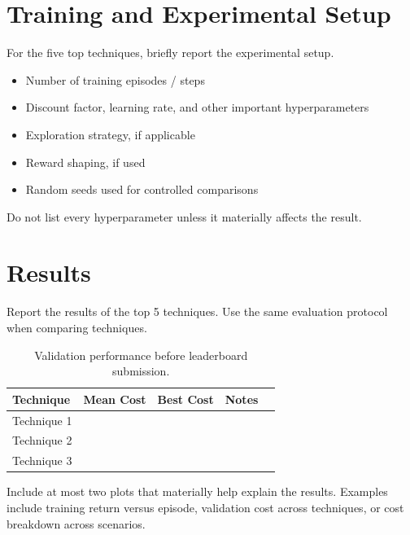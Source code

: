 \documentclass[11pt,a4paper]{article}
\begin{document}
\section{Training and Experimental Setup}

For the five top techniques, briefly report the experimental setup.

\begin{itemize}
    \item Number of training episodes / steps
    \item Discount factor, learning rate, and other important hyperparameters
    \item Exploration strategy, if applicable
    \item Reward shaping, if used
    \item Random seeds used for controlled comparisons
\end{itemize}

Do not list every hyperparameter unless it materially affects the result.

\section{Results}

Report the results of the top 5 techniques. Use the same evaluation protocol when comparing techniques.
\begin{table}[H]
\centering
\small
\begin{tabular}{lrrrr}
\toprule
\textbf{Technique} & \textbf{Mean Cost} & \textbf{Best Cost} & \textbf{Notes} \\
\midrule
Technique 1 &  &  &  \\
Technique 2 &  &  &  \\
Technique 3 &  &  &  \\
\bottomrule
\end{tabular}
\caption{Validation performance before leaderboard submission.}
\end{table}

Include at most two plots that materially help explain the results. Examples include training return versus episode, validation cost across techniques, or cost breakdown across scenarios.

\end{document}
